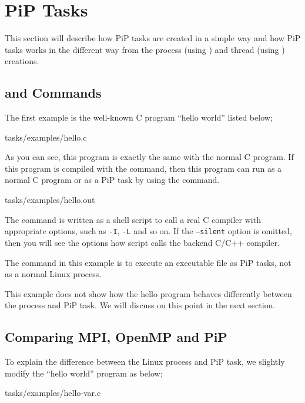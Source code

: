 
\section{PiP Tasks}

This section will describe how PiP tasks are created in a simple way
and how PiP tasks works in the different way from the process (using
) and thread (using ) creations.

\subsection{ and  Commands}
\label{sec:pipcc-exec}

The first example is  the well-known C program ``hello world'' listed
below; 


                {tasks/examples/hello.c}

As you can see, this program is exactly the same with the normal C
program. If this program is compiled with the  command,
then this program can run as a normal C program or as a PiP task by
using the  command.


                {tasks/examples/hello.out}

The  command is written as a shell script to call a real
C compiler with appropriate options, such as {\tt -I}, {\tt -L} and so
on. If the {\tt --silent} option is omitted, then you will see the
options how  script calls the backend C/C++ compiler.

The  command in this example is to execute an
executable file as PiP tasks, not as a normal Linux process.

This example does not show how the hello program behaves differently
between the process and PiP task. We will discuss on this
point in the next section.

\subsection{Comparing MPI, OpenMP and PiP}

To explain the difference between the Linux process and PiP task, we slightly
modify the ``hello world'' program as below;

 {tasks/examples/hello-var.c}

